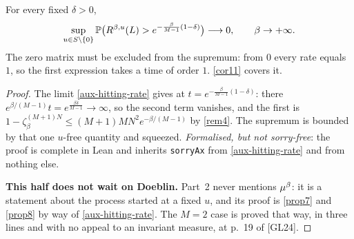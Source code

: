 \begin{theorem}
  \label{thm2-2}
  \leanok
  For every fixed $\delta > 0$,
  \[
    \sup_{u \in S \setminus \{0\}}
      \mathbb{P}\bigl(R^{\beta,u}(L) > e^{-\frac{\beta}{M-1}(1-\delta)}\bigr)
      \longrightarrow 0, \qquad \beta \to +\infty .
  \]
  The zero matrix must be excluded from the supremum: from $0$ every rate
  equals $1$, so the first expression takes a time of order $1$. \ref{cor11}
  covers it.
\end{theorem}
\begin{proof}
  \leanok
  The limit \ref{aux-hitting-rate} gives at $t = e^{-\frac{\beta}{M-1}(1-\delta)}$:
  there $e^{\beta/(M-1)} t = e^{\frac{\beta\delta}{M-1}} \to \infty$, so the
  second term vanishes, and the first is $1 - \zeta_\beta^{(M+1)N} \le
  (M+1)MN^2 e^{-\beta/(M-1)}$ by \ref{rem4}.  The supremum is bounded by that
  one $u$-free quantity and squeezed.  \emph{Formalised, but not sorry-free}:
  the proof is complete in Lean and inherits \texttt{sorryAx} from
  \ref{aux-hitting-rate} and from nothing else.

  \textbf{This half does not wait on Doeblin.}  Part~2 never mentions
  $\mu^\beta$: it is a statement about the process started at a fixed $u$, and its
  proof is \ref{prop7} and \ref{prop8} by way of \ref{aux-hitting-rate}.  The
  $M = 2$ case is proved that way, in three lines and with no appeal to an
  invariant measure, at p.~19 of [GL24].
\end{proof}

